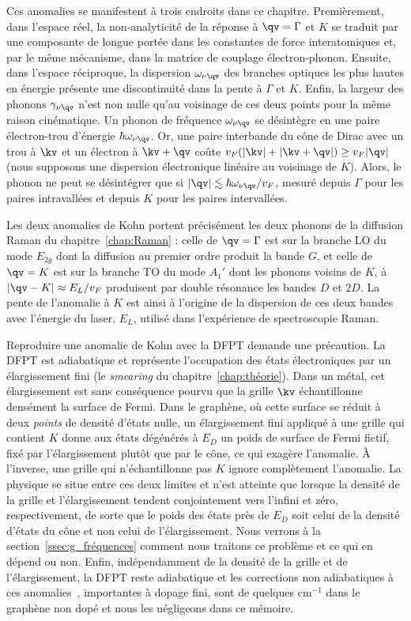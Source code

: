 Ces anomalies se manifestent à trois endroits dans ce chapitre. Premièrement, dans l'espace réel, la non-analyticité de la réponse à $\qv=\Gamma$ et $K$ se traduit par une composante de longue portée dans les constantes de force interatomiques et, par le même mécanisme, dans la matrice de couplage électron-phonon. Ensuite, dans l'espace réciproque, la dispersion $\omega_{\nu\qv}$ des branches optiques les plus hautes en énergie présente une discontinuité dans la pente à $\Gamma$ et $K$. Enfin, la largeur des phonons $\gamma_{\nu\qv}$ n'est non nulle qu'au voisinage de ces deux points pour la même raison cinématique. Un phonon de fréquence $\omega_{\nu\qv}$ se désintègre en une paire électron-trou d'énergie $\hbar\omega_{\nu\qv}$. Or, une paire interbande du cône de Dirac avec un trou à $\kv$ et un électron à $\kv+\qv$ coûte $v_F(|\kv|+|\kv+\qv|)\geq v_F|\qv|$ (nous supposons une dispersion électronique linéaire au voisinage de $K$). Alors, le phonon ne peut se désintégrer que si $|\qv|\lesssim\hbar\omega_{\nu\qv}/v_F$, mesuré depuis $\Gamma$ pour les paires intravallées et depuis $K$ pour les paires intervallées.

Les deux anomalies de Kohn portent précisément les deux phonons de la diffusion Raman du chapitre~\ref{chap:Raman} : celle de $\qv=\Gamma$ est sur la branche LO du mode $E_{2g}$ dont la diffusion au premier ordre produit la bande $G$, et celle de $\qv=K$ est sur la branche TO du mode $A_1'$ dont les phonons voisins de $K$, à $|\qv-K|\approx E_L/v_F$ produisent par double résonance les bandes $D$ et $2D$. La pente de l'anomalie à $K$ est ainsi à l'origine de la dispersion de ces deux bandes avec l'énergie du laser, $E_L$, utilisé dans l'expérience de spectroscopie Raman.

Reproduire une anomalie de Kohn avec la DFPT demande une précaution. La DFPT est adiabatique et représente l'occupation des états électroniques par un élargissement fini (le \textit{smearing} du chapitre~\ref{chap:théorie}). Dans un métal, cet élargissement est sans conséquence pourvu que la grille $\kv$ échantillonne densément la surface de Fermi. Dans le graphène, où cette surface se réduit à deux \textit{points} de densité d'états nulle, un élargissement fini appliqué à une grille qui contient $K$ donne aux états dégénérés à $E_D$ un poids de surface de Fermi fictif, fixé par l'élargissement plutôt que par le cône, ce qui exagère l'anomalie. À l'inverse, une grille qui n'échantillonne pas $K$ ignore complètement l'anomalie. La physique se situe entre ces deux limites et n'est atteinte que lorsque la densité de la grille et l'élargissement tendent conjointement vers l'infini et zéro, respectivement, de sorte que le poids des états près de $E_D$ soit celui de la densité d'états du cône et non celui de l'élargissement. Nous verrons à la section~\ref{ssec:g_fréquences} comment nous traitons ce problème et ce qui en dépend ou non. Enfin, indépendamment de la densité de la grille et de l'élargissement, la DFPT reste adiabatique et les corrections non adiabatiques à ces anomalies~\cite{lazzeriNonadiabaticKohnanomalyDoped2006}, importantes à dopage fini, sont de quelques cm$^{-1}$ dans le graphène non dopé et nous les négligeons dans ce mémoire.

